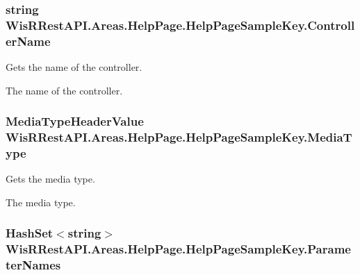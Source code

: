 \subsubsection[{Controller\+Name}]{\setlength{\rightskip}{0pt plus 5cm}string Wis\+R\+Rest\+A\+P\+I.\+Areas.\+Help\+Page.\+Help\+Page\+Sample\+Key.\+Controller\+Name\hspace{0.3cm}{\ttfamily [get]}}\label{class_wis_r_rest_a_p_i_1_1_areas_1_1_help_page_1_1_help_page_sample_key_a8b5f8df70561ef1b938918bfad55df4a}


Gets the name of the controller. 

The name of the controller. \hypertarget{class_wis_r_rest_a_p_i_1_1_areas_1_1_help_page_1_1_help_page_sample_key_a6fd344e923164c651efbd3d1050fe035}{}
\subsubsection[{Media\+Type}]{\setlength{\rightskip}{0pt plus 5cm}Media\+Type\+Header\+Value Wis\+R\+Rest\+A\+P\+I.\+Areas.\+Help\+Page.\+Help\+Page\+Sample\+Key.\+Media\+Type\hspace{0.3cm}{\ttfamily [get]}}\label{class_wis_r_rest_a_p_i_1_1_areas_1_1_help_page_1_1_help_page_sample_key_a6fd344e923164c651efbd3d1050fe035}


Gets the media type. 

The media type. \hypertarget{class_wis_r_rest_a_p_i_1_1_areas_1_1_help_page_1_1_help_page_sample_key_a2cde26129e19cbacc6ad2c63809c5c15}{}
\subsubsection[{Parameter\+Names}]{\setlength{\rightskip}{0pt plus 5cm}Hash\+Set$<$string$>$ Wis\+R\+Rest\+A\+P\+I.\+Areas.\+Help\+Page.\+Help\+Page\+Sample\+Key.\+Parameter\+Names\hspace{0.3cm}{\ttfamily [get]}}\label{class_wis_r_rest_a_p_i_1_1_areas_1_1_help_page_1_1_help_page_sample_key_a2cde26129e19cbacc6ad2c63809c5c15}



